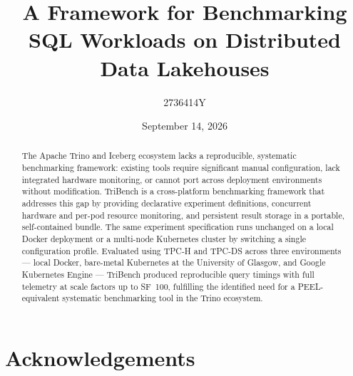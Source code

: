 \documentclass{l4proj}
\begin{document}
\title{A Framework for Benchmarking SQL Workloads on Distributed Data Lakehouses} %
\author{2736414Y}
\date{September 14, 2026}

\maketitle

\begin{abstract}
    The Apache Trino and Iceberg ecosystem lacks a reproducible, systematic benchmarking framework: existing tools require significant manual configuration, lack integrated hardware monitoring, or cannot port across deployment environments without modification. TriBench is a cross-platform benchmarking framework that addresses this gap by providing declarative experiment definitions, concurrent hardware and per-pod resource monitoring, and persistent result storage in a portable, self-contained bundle. The same experiment specification runs unchanged on a local Docker deployment or a multi-node Kubernetes cluster by switching a single configuration profile. Evaluated using TPC-H and TPC-DS across three environments --- local Docker, bare-metal Kubernetes at the University of Glasgow, and Google Kubernetes Engine --- TriBench produced reproducible query timings with full telemetry at scale factors up to SF~100, fulfilling the identified need for a PEEL-equivalent systematic benchmarking tool in the Trino ecosystem.

    
\end{abstract}

\chapter*{Acknowledgements}
%
%


%
%
\def\consentname {Lin Yuan} %
\def\consentdate {20 March 2026} %
%
\educationalconsent
\end{document}
